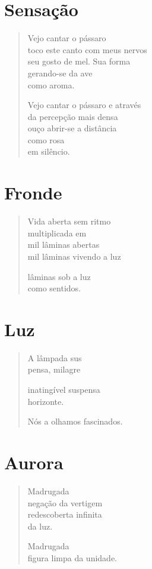 \chapter{Sensação}

\begin{verse}
Vejo cantar o pássaro\\
toco este canto com meus nervos\\
seu gosto de mel. Sua forma\\
gerando-se da ave\\
como aroma.

Vejo cantar o pássaro e através\\
da percepção mais densa\\
ouço abrir-se a distância\\
como rosa\\
em silêncio.
\end{verse}

\chapter{Fronde}

\begin{verse}
Vida aberta sem ritmo\\
multiplicada em\\
mil lâminas abertas\\
mil lâminas vivendo a luz

lâminas sob a luz\\
como sentidos.
\end{verse}

\chapter{Luz}

\begin{verse}
A lâmpada sus\\
pensa, milagre

inatingível suspensa\\
horizonte.

Nós a olhamos fascinados.
\end{verse}

\chapter{Aurora}

\begin{verse}
Madrugada\\
negação da vertigem\\
redescoberta infinita\\
da luz.

Madrugada\\
figura limpa da unidade.
\end{verse}

